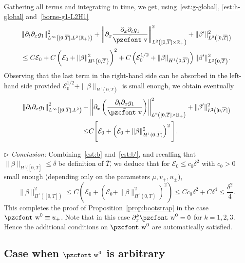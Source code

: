 \documentclass[10pt]{amsart}
\theoremstyle{definition}\newtheorem{defi}[theo]{Definition}\newtheorem{rema}[theo]{Remark}\newtheorem{exam}[theo]{Example}\newtheorem{exem}[theo]{Example}\newtheorem{nota}[theo]{Notation}
\newcommand{\mathpzc}[1]{\text{\pzcfont #1}}
\newcommand{\R}{\mathbb{R}}
\newcommand{\p}{\partial}
\newcommand{\bv}{\bar{\mathpzc{v}}}
\newcommand{\cE}{\mathcal E}
\newcommand{\tw}{\mathpzc{w}}
\begin{document}
Gathering all terms and integrating in time, we get, using~\eqref{est:g-global}, \eqref{est:h-global} and~\eqref{borne-g1-L2H1}
\begin{multline}
\| \partial_t \p_x g_1\|_{L^\infty\left([0,\overline{T}], L^2(\R_+)\right)}^2 + \left\|\p_x \frac{\p_x \partial_t g_1}{\bv}\right\|^2_{L^2\left([0,\overline{T}]\times \R_+\right)}+ \|\beta'\|_{L^2\left([0,\overline{T}]\right)}^2\\
\leq C\cE_0 + C\left(\cE_0 + \|\beta\|_{H^1\left(0,\overline{T}\right)}^2\right)^2 + C\left(\cE_0^{1/2} + \|\beta\|_{H^1\left(0,\overline{T}\right)}\right)\|\beta'\|_{L^2\left(0,\overline{T}\right)}^2.
\end{multline}
Observing that the last term in the right-hand side can be absorbed in the left-hand side provided $\cE_0^{1/2} + \|\beta\|_{H^1(0,\overline{T})}$ is small enough, we obtain eventually
\begin{equation}\label{est:b'}
\begin{split}
\left\|\partial_t \partial_x g_1\right\|_{L^\infty\left([0,\overline{T}], L^2\right)}^2 +& \left\|\partial_x \left(\dfrac{\partial_t \partial_x g_1}{\bv} \right) \right\|_{L^2\left([0, \overline{T}] \times \R_+\right)}^2 + \|\beta'\|_{L^2\left([0,\overline{T}]\right)}^2 \\
\leq &C \Bigg[\cE_0 + \left(\cE_0 +\|\beta\|_{H^1(0,\overline{T})}^2\right)^2 \Bigg].
\end{split}
\end{equation}


$\rhd$ \emph{Conclusion:} Combining~\eqref{est:b} and~\eqref{est:b'}, and recalling that $\|\beta\|_{H^1([0, \overline{T}]}\leq \delta$ be definition of $\overline{T}$, we deduce that for $\cE_0 \leq c_0 \delta^2$ with $c_0 > 0$ small enough (depending only on the parameters $\mu, v_+,u_\pm$),
\[
\|\beta\|_{H^1\left([0, \overline{T}]\right)}^2 \leq C \left(\cE_0 + \left(\cE_0 + \|\beta\|_{H^1\left(0,\overline{T}\right)}^2\right)^2\right) \leq C c_0 \delta^2 + C \delta^4 \leq \frac{\delta^2}{4}.
\]
This completes the proof of Proposition~\ref{prop:bootstrap} in the case $\tw^0\equiv u_+$. {Note that in this case $\p_x^k \tw^0=0$ for $k=1,2,3$. Hence the additional conditions on $\tw^0$ are automatically satisfied.}

\subsection{Case when \texorpdfstring{$\tw^0$}{w0} is arbitrary}\label{ssec:w0-qcq}
\end{document}
